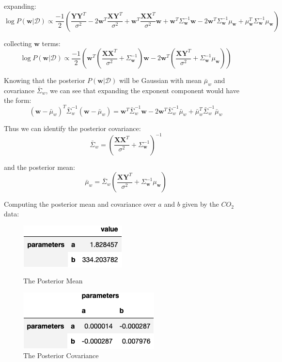 \documentclass[12pt]{article}
\begin{document}
expanding:
\[\log P(\textbf{w} | \mathcal{D}) \propto
  \frac{-1}{2} \left( \frac{\textbf{Y} \textbf{Y}^T}{\sigma^2} - 2\textbf{w}^T \frac{\textbf{X}\textbf{Y}^T}{\sigma^2} + \textbf{w}^T \frac{\textbf{X} \textbf{X}^T}{\sigma^2} \textbf{w} +  \textbf{w}^T \Sigma_{\textbf{w}}^{-1}  \textbf{w} - 2\textbf{w}^T \Sigma_{\textbf{w}}^{-1}\mu_{\textbf{w}} + \mu_{\textbf{w}}^T\Sigma_{\textbf{w}}^{-1}\mu_{\textbf{w}} \right)
\]

collecting $\textbf{w}$ terms:
\[\log P(\textbf{w} | \mathcal{D}) \propto
  \frac{-1}{2} \left( \textbf{w}^T \left(\frac{\textbf{X} \textbf{X}^T}{\sigma^2} + \Sigma_{\textbf{w}}^{-1} \right)  \textbf{w} - 2\textbf{w}^T \left(\frac{\textbf{X}\textbf{Y}^T}{\sigma^2} + \Sigma_{\textbf{w}}^{-1} \mu_{\textbf{w}}\right)  \right)
\]

Knowing that the posterior $P(\textbf{w} | \mathcal{D})$ will be Gaussian with mean $\bar{\mu}_w$ and covariance $\bar{\Sigma}_w$, we can see that expanding the exponent component would have the form:
\[\left( \textbf{w} - \bar{\mu}_w \right)^T \bar{\Sigma}_w^{-1} \left( \textbf{w} - \bar{\mu}_w \right) = \textbf{w}^T \bar{\Sigma}_w^{-1} \textbf{w} -2 \textbf{w}^T \bar{\Sigma}_w^{-1} \bar{\mu}_w + \bar{\mu}_w^T \bar{\Sigma}_w^{-1} \bar{\mu}_w\]

Thus we can identify the posterior covariance:
\[\bar{\Sigma}_w = \left(\frac{\textbf{X} \textbf{X}^T}{\sigma^2} + \Sigma_{\textbf{w}}^{-1} \right)^{-1}\]

and the posterior mean:
\[\bar{\mu}_w = \bar{\Sigma}_w \left(\frac{\textbf{X}\textbf{Y}^T}{\sigma^2} + \Sigma_{\textbf{w}}^{-1} \mu_{\textbf{w}}\right) \]

\newpage
Computing the posterior mean and covariance over $a$ and $b$ given by the $CO_2$ data:


\begin{figure}[h]
\centering
\begin{minipage}{.5\textwidth}
  \centering
\includegraphics[scale = 0.5]{outputs/q2/a-mean}
\caption{The Posterior Mean}
\label{fig:fig2-a-mean}
\end{minipage}%
\begin{minipage}{.5\textwidth}
  \centering
\includegraphics[scale = 0.5]{outputs/q2/a-covariance}
\caption{The Posterior Covariance}
\label{fig:fig2-a-covariance}
\end{minipage}
\end{figure}
\end{document}
